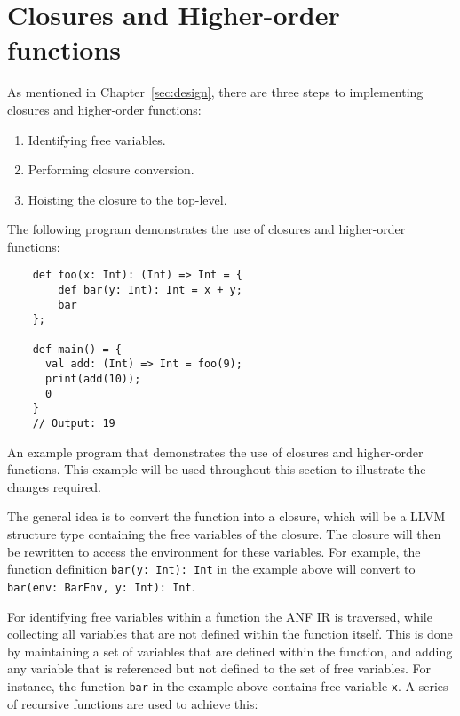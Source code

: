 \section{Closures and Higher-order functions}

As mentioned in Chapter~\ref{sec:design}, there are three steps to implementing closures and
higher-order functions:

\begin{enumerate}
    \singlespacing
    \item Identifying free variables.
    \item Performing closure conversion.
    \item Hoisting the closure to the top-level.
\end{enumerate}

The following program demonstrates the use of closures and higher-order functions:

\begin{tcolorbox}
    \begin{verbatim}
    def foo(x: Int): (Int) => Int = {
        def bar(y: Int): Int = x + y;
        bar
    };

    def main() = {
      val add: (Int) => Int = foo(9);
      print(add(10));
      0
    }
    // Output: 19
    \end{verbatim}
    \tcblower
    \footnotesize
    An example program that demonstrates the use of closures and higher-order functions.
    This example will be used throughout this section to illustrate the changes required.
\end{tcolorbox}

The general idea is to convert the function into a closure, which will be a LLVM structure type
containing the free variables of the closure. The closure will then be rewritten to access the
environment for these variables. For example, the function definition
\texttt{bar(y: Int): Int}
in the example above will convert to
\texttt{bar(env: BarEnv, y: Int): Int}.

For identifying free variables within a function the ANF IR is traversed, while collecting all
variables that are not defined within the function itself. This is done by maintaining a set of
variables that are defined within the function, and adding any variable that is referenced but not
defined to the set of free variables. For instance, the function \texttt{bar} in the example above
contains free variable \texttt{x}. A series of recursive functions are used to achieve this:

